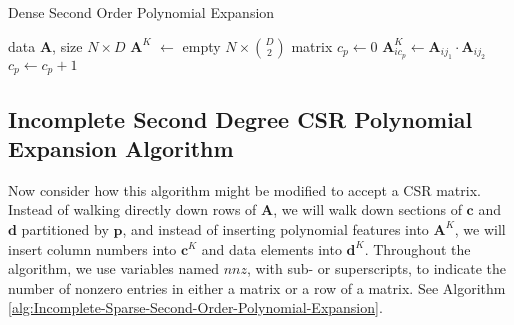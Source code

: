 \documentclass{article}
\begin{document}

\begin{algorithm}%
   \caption{Dense Second Order Polynomial Expansion}
   \label{alg:Dense-Second-Order-Polynomial-Expansion}
\begin{algorithmic}[1]
    data $\bm{A}$, size $N \times D$
   \STATE $\bm{A}^K$ $\gets$ empty $N \times \binom{D}{2}$ matrix
      \STATE $c_p \gets 0$
              \STATE $\bm{A}^K_{i{c_p}} \gets \bm{A}_{ij_1} \cdot \bm{A}_{ij_2}$
              \STATE $c_p \gets c_p + 1$
          \ENDFOR
      \ENDFOR
   \ENDFOR
\end{algorithmic}
\end{algorithm}


\subsection{Incomplete Second Degree CSR Polynomial Expansion Algorithm}
\label{sec:final-algo}
Now consider how this algorithm might be modified to accept a CSR matrix.
Instead of walking directly down rows of $\bm{A}$, we will walk down sections of $\bm{c}$ and $\bm{d}$ partitioned by $\bm{p}$, and instead of inserting polynomial features into $\bm{A}^K$, we will insert column numbers into $\bm{c}^K$ and data elements into $\bm{d}^K$.
Throughout the algorithm, we use variables named $nnz$, with sub- or superscripts, to indicate the number of nonzero entries in either a matrix or a row of a matrix. 
See Algorithm \ref{alg:Incomplete-Sparse-Second-Order-Polynomial-Expansion}.

\end{document}
